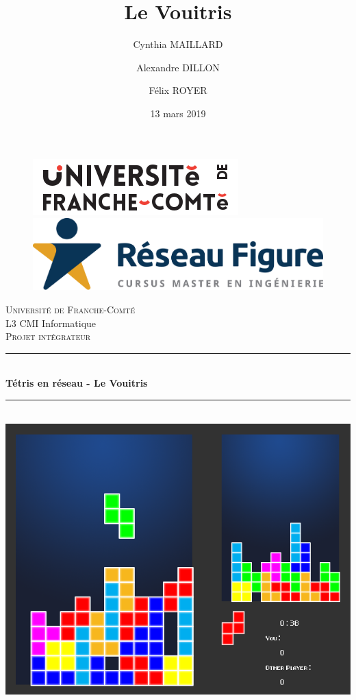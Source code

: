 \documentclass[a4paper, 12pt]{article}
\title{Le Vouitris}
\date{13 mars 2019}
\author{Cynthia MAILLARD \and Alexandre DILLON \and Félix ROYER}
\newcommand{\Hrule}{\rule{\linewidth}{0.5mm}}
\begin{document}
\begin{titlepage}
        
    \begin{figure}
       \begin{minipage}[c]{.46\linewidth}
            \includegraphics[scale=0.5]{img/logU.png} 
       \end{minipage} \hfill
       \begin{minipage}[c]{.46\linewidth}
              \includegraphics[scale=0.08]{img/logF.jpg} 
       \end{minipage}
    \end{figure}

    \begin{sffamily}
    \begin{center}

    \textsc{Université de Franche-Comté}\\[0.2cm]
     L3 CMI Informatique\\[0.5cm]

    \textsc{Projet intégrateur}\\[0.5cm]

    \Hrule \\[0.2mm]

    { \huge \bfseries Tétris en réseau - Le Vouitris\\[0.8mm]}

    \Hrule\\[1cm]

    \includegraphics[scale=0.30]{img/vouitris.png} 


\end{center}
\end{sffamily}
\end{titlepage}
\end{document}
